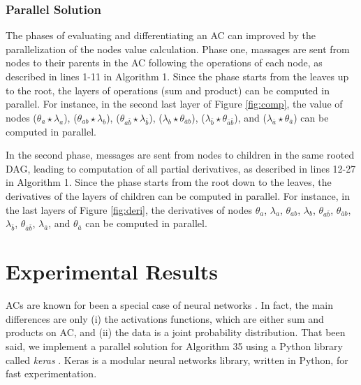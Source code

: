 \documentclass[twoside,11pt]{article}
\begin{document}
\subsubsection{Parallel Solution}

The phases of evaluating and differentiating an AC can improved by the parallelization of the nodes value calculation.
Phase one, massages are sent from nodes to their parents in the AC following the operations of each node, as described in lines 1-11 in Algorithm 1.
Since the phase starts from the leaves up to the root, the layers of operations (sum and product) can be computed in parallel.
For instance, in the second last layer of Figure \ref{fig:comp}, the value of nodes 
($\theta_a \star \lambda_a$), 
($\theta_{ab} \star \lambda_{{b}}$), 
($\theta_{a{\bar b}} \star \lambda_{{\bar b}}$),
($\lambda_{{b}} \star \theta_{{\bar a}b}$),
($\lambda_{{\bar b}} \star \theta_{{\bar a}\bar{b}}$), and
($\lambda_{{\bar a}} \star \theta_{{\bar a}}$) 
can be computed in parallel.


In the second phase, messages are sent from nodes to children in the same rooted DAG, leading to computation of all partial derivatives, as described in lines 12-27 in Algorithm 1.
Since the phase starts from the root down to the leaves, the derivatives of the layers of children can be computed in parallel.
For instance, in the last layers of Figure \ref{fig:deri}, the derivatives of  nodes 
$\theta_a $,
$\lambda_a$,
$\theta_{ab}$,
$\lambda_{{b}}$,
$\theta_{a{\bar b}}$,
$\theta_{{\bar a}b}$,
$\lambda_{{\bar b}}$,
$\theta_{\bar{a}\bar{b}}$,
$\lambda_{{\bar a}}$, and
$\theta_{{\bar a}}$
can be computed in parallel.

\section{Experimental Results}
\label{sec:exp}

ACs are known for been a special case of neural networks \citep{poon2011sum,delalleau2011shallow,peharz2013greedy}.
In fact, the main differences are only (i) the activations functions, which are either sum and products on AC, and (ii) the data is a joint probability distribution.
That been said, we implement a parallel solution for Algorithm 35 using a Python library called \emph{keras} \citep{chollet2015}.
Keras is a modular neural networks library, written in Python, for fast experimentation.
\end{document}
